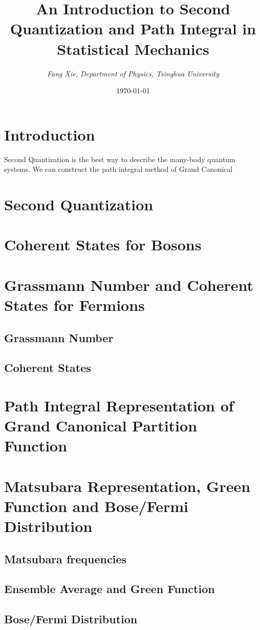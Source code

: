 \documentclass{article}
\author{\emph{Fang Xie, Department of Physics, Tsinghua University}}
\title{{\bf{An Introduction to Second Quantization and Path Integral in Statistical Mechanics}}}
\date{\today}
\begin{document}
\maketitle
\section{Introduction}
Second Quantization is the best way to describe the many-body quantum systems. We can construct the path integral method of Grand Canonical 

\section{Second Quantization}

\section{Coherent States for Bosons}

\section{Grassmann Number and Coherent States for Fermions}
\subsection{Grassmann Number}
\subsection{Coherent States}

\section{Path Integral Representation of Grand Canonical Partition Function}

\section{Matsubara Representation, Green Function and Bose/Fermi Distribution}
\subsection{Matsubara frequencies}
\subsection{Ensemble Average and Green Function}
\subsection{Bose/Fermi Distribution}
\end{document}
